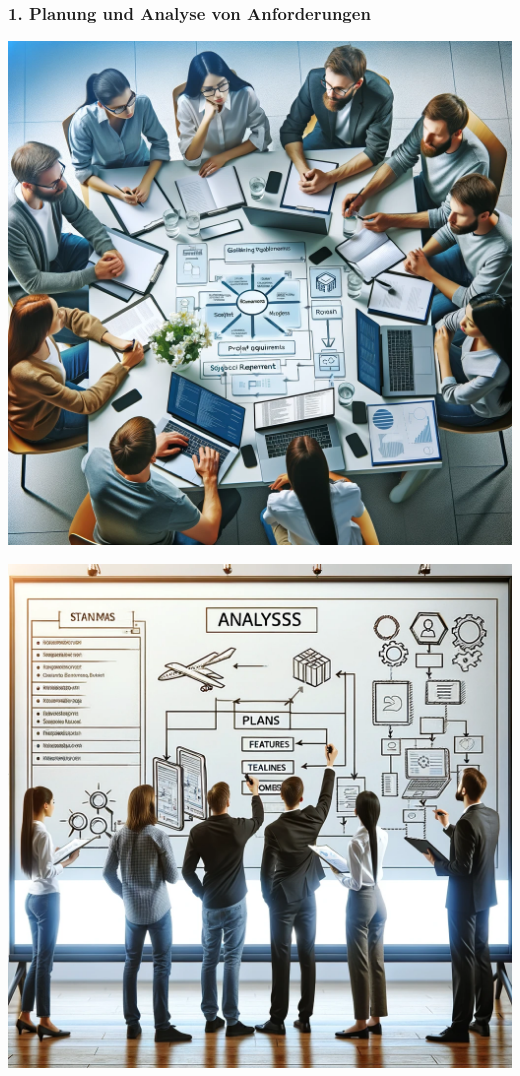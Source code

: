 \documentclass{beamer}
\begin{document}
\begin{frame}
    \frametitle{1. Planung und Analyse von Anforderungen}
    \begin{minipage}{0.45\textwidth}
        \includegraphics[width=\textwidth]{img/1.png}
    \end{minipage}
    \hfill
    \begin{minipage}{0.45\textwidth}
        \includegraphics[width=\textwidth]{img/2.png}
    \end{minipage}
\end{frame}
\end{document}
